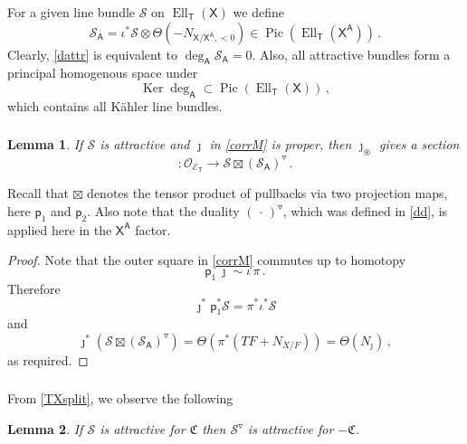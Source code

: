 \documentclass[14pt]{extarticle}
\newcommand{\bT}{\mathsf{T}}
\newcommand{\bA}{\mathsf{A}}
\newcommand{\bX}{\mathsf{X}}
\newcommand{\cE}{\mathscr{E}}
\newcommand{\fC}{\mathfrak{C}}
\newcommand{\cS}{\mathscr{S}}
\newcommand{\cO}{\mathscr{O}}
\newcommand{\ppf}{{\circledast}}
\newcommand{\pf}{_{\ppf}}
\newcommand{\forp}{\mathsf{p}}
\newcommand{\Attr}{\mathsf{Attr}}
\newcommand{\dd}{\triangledown}
\DeclareMathOperator{\Ker}{Ker}
\DeclareMathOperator{\Ell}{Ell}
\DeclareMathOperator{\Pic}{Pic}
\newtheorem{Lemma}{Lemma}[section]
\theoremstyle{definition}
\begin{document}
\medskip 

\noindent 
For a given line bundle $\cS$ on $\Ell_\bT(\bX)$ we define
%
\begin{equation}
\cS_\bA = \iota^* \cS \otimes \Theta(-N_{\bX/\bX^\bA,<0})
\in \Pic (\Ell_\bT(\bX^\bA)) \,. \label{cSbA}
\end{equation}
%
Clearly, \eqref{dattr} is equivalent to $\deg_\bA \cS_\bA = 0$.
Also, all attractive bundles form a principal homogenous space under
$$
\Ker \deg_\bA \subset \Pic(\Ell_\bT(\bX)) \,,
$$
which contains all K\"ahler line bundles. 

\subsubsection{}
\begin{Lemma}
  If $\cS$ is attractive and $\jmath$ in \eqref{corrM} is proper,
  then $\jmath\pf$ gives a section
  \begin{equation}
  [\Attr] : \cO_{\cE_\bT}  \to \cS \boxtimes \left(\cS_\bA\right)^\dd
  \,. 
\label{[Attr]}
\end{equation} %
\end{Lemma}

\noindent
Recall that $\boxtimes$ denotes the tensor product of pullbacks via two projection
maps, here $\forp_1$ and $\forp_2$. 
Also note that the duality
$(\, \cdot \,)^\dd$, which was defined in \eqref{dd}, is applied here
in the $\bX^\bA$ factor.

\begin{proof}
Note that  the outer square in \eqref{corrM} commutes up to
  homotopy
  \begin{equation}
    \label{homot}
    \forp_1 \, \jmath \sim \iota \, \pi \,. 
  \end{equation}
  Therefore
  $$
  \jmath^* \forp_1^* \cS = \pi^* \iota^* \cS
  $$
  and 
  $$
  \jmath^* \left(\cS \boxtimes \left(\cS_\bA\right)^\dd \right)=
  \Theta(\pi^*(T F + N_{X/F})) = \Theta(N_{\jmath}) \,,
  $$
  as required. 
\end{proof}

\subsubsection{}
{}From \eqref{TXsplit}, we observe the following

\begin{Lemma}
If $\cS$ is attractive for $\fC$ then $\cS^\dd$ is attractive for
$-\fC$. 
\end{Lemma}
\end{document}
